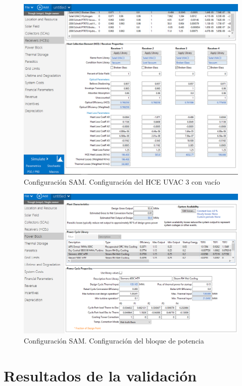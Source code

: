 \begin{figure}
\includegraphics[scale=0.8]{images/captura_sam03.png}
\caption{Configuración SAM. Configuración del HCE UVAC 3 con vacío}
\label{fig:captura03}
\end{figure}

\begin{figure}
\includegraphics[scale=0.8]{images/captura_sam04.png}
\caption{Configuración SAM. Configuración del bloque de potencia} 
\label{fig:captura04}
\end{figure}

\section{Resultados de la validación}
 
